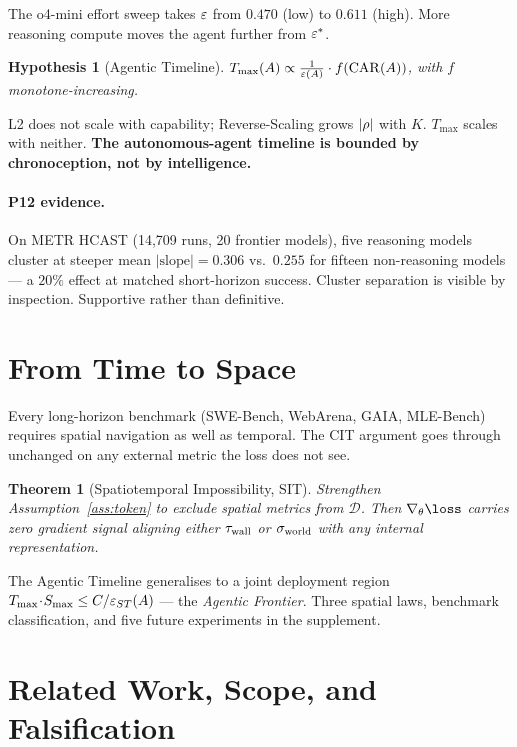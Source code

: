 \documentclass[letterpaper]{article}
\newtheorem{theorem}{Theorem}
\newtheorem{hypothesis}{Hypothesis}
\begin{document}
The o4-mini effort sweep takes $\varepsilon$ from $0.470$ (low) to $0.611$ (high). More reasoning compute moves the agent further from $\varepsilon^{*}$.

\begin{hypothesis}[Agentic Timeline]
$T_{\max}(A) \propto \frac{1}{\varepsilon(A)}\cdot f(\mathrm{CAR}(A))$, with $f$ monotone-increasing.
\end{hypothesis}

L2 does not scale with capability; Reverse-Scaling grows $|\rho|$ with $K$. $T_{\max}$ scales with neither. \textbf{The autonomous-agent timeline is bounded by chronoception, not by intelligence.}

\paragraph{P12 evidence.}
On METR HCAST (14,709 runs, 20 frontier models), five reasoning models cluster at steeper mean $|\text{slope}| = 0.306$ vs.\ $0.255$ for fifteen non-reasoning models --- a $20\%$ effect at matched short-horizon success. Cluster separation is visible by inspection. Supportive rather than definitive.

\section{From Time to Space}
\label{sec:sit}

Every long-horizon benchmark (SWE-Bench, WebArena, GAIA, MLE-Bench) requires spatial navigation as well as temporal. The CIT argument goes through unchanged on any external metric the loss does not see.

\begin{theorem}[Spatiotemporal Impossibility, SIT]
\label{thm:sit}
Strengthen Assumption~\ref{ass:token} to exclude spatial metrics from $\mathcal{D}$. Then $\nabla_\theta \loss$ carries zero gradient signal aligning either $\tau_{\mathrm{wall}}$ or $\sigma_{\mathrm{world}}$ with any internal representation.
\end{theorem}

The Agentic Timeline generalises to a joint deployment region $T_{\max}\!\cdot\!S_{\max} \leq C/\varepsilon_{ST}(A)$ --- the \emph{Agentic Frontier}. Three spatial laws, benchmark classification, and five future experiments in the supplement.

\section{Related Work, Scope, and Falsification}
\label{sec:related}
\end{document}
